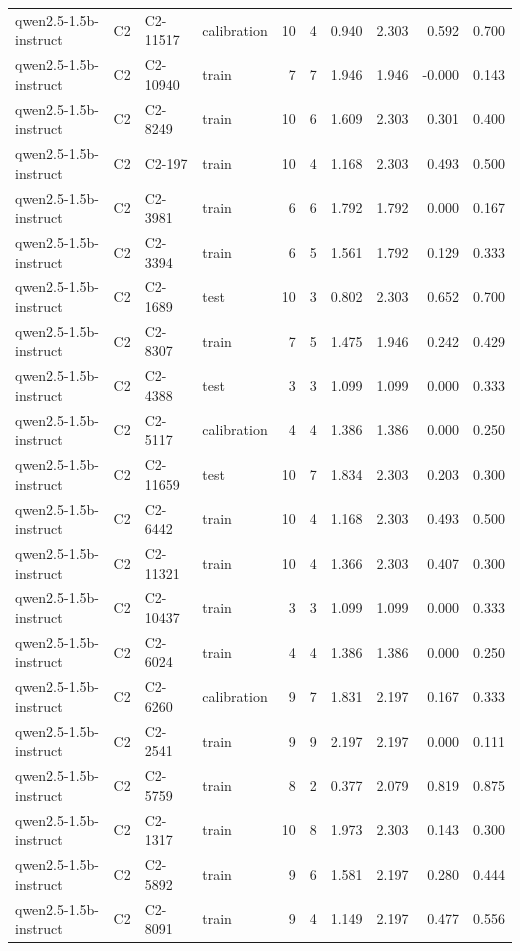 \begin{table}
\begin{tabular}{llllrrrrrr}
qwen2.5-1.5b-instruct & C2 & C2-11517 & calibration & 10 & 4 & 0.940 & 2.303 & 0.592 & 0.700 \\
qwen2.5-1.5b-instruct & C2 & C2-10940 & train & 7 & 7 & 1.946 & 1.946 & -0.000 & 0.143 \\
qwen2.5-1.5b-instruct & C2 & C2-8249 & train & 10 & 6 & 1.609 & 2.303 & 0.301 & 0.400 \\
qwen2.5-1.5b-instruct & C2 & C2-197 & train & 10 & 4 & 1.168 & 2.303 & 0.493 & 0.500 \\
qwen2.5-1.5b-instruct & C2 & C2-3981 & train & 6 & 6 & 1.792 & 1.792 & 0.000 & 0.167 \\
qwen2.5-1.5b-instruct & C2 & C2-3394 & train & 6 & 5 & 1.561 & 1.792 & 0.129 & 0.333 \\
qwen2.5-1.5b-instruct & C2 & C2-1689 & test & 10 & 3 & 0.802 & 2.303 & 0.652 & 0.700 \\
qwen2.5-1.5b-instruct & C2 & C2-8307 & train & 7 & 5 & 1.475 & 1.946 & 0.242 & 0.429 \\
qwen2.5-1.5b-instruct & C2 & C2-4388 & test & 3 & 3 & 1.099 & 1.099 & 0.000 & 0.333 \\
qwen2.5-1.5b-instruct & C2 & C2-5117 & calibration & 4 & 4 & 1.386 & 1.386 & 0.000 & 0.250 \\
qwen2.5-1.5b-instruct & C2 & C2-11659 & test & 10 & 7 & 1.834 & 2.303 & 0.203 & 0.300 \\
qwen2.5-1.5b-instruct & C2 & C2-6442 & train & 10 & 4 & 1.168 & 2.303 & 0.493 & 0.500 \\
qwen2.5-1.5b-instruct & C2 & C2-11321 & train & 10 & 4 & 1.366 & 2.303 & 0.407 & 0.300 \\
qwen2.5-1.5b-instruct & C2 & C2-10437 & train & 3 & 3 & 1.099 & 1.099 & 0.000 & 0.333 \\
qwen2.5-1.5b-instruct & C2 & C2-6024 & train & 4 & 4 & 1.386 & 1.386 & 0.000 & 0.250 \\
qwen2.5-1.5b-instruct & C2 & C2-6260 & calibration & 9 & 7 & 1.831 & 2.197 & 0.167 & 0.333 \\
qwen2.5-1.5b-instruct & C2 & C2-2541 & train & 9 & 9 & 2.197 & 2.197 & 0.000 & 0.111 \\
qwen2.5-1.5b-instruct & C2 & C2-5759 & train & 8 & 2 & 0.377 & 2.079 & 0.819 & 0.875 \\
qwen2.5-1.5b-instruct & C2 & C2-1317 & train & 10 & 8 & 1.973 & 2.303 & 0.143 & 0.300 \\
qwen2.5-1.5b-instruct & C2 & C2-5892 & train & 9 & 6 & 1.581 & 2.197 & 0.280 & 0.444 \\
qwen2.5-1.5b-instruct & C2 & C2-8091 & train & 9 & 4 & 1.149 & 2.197 & 0.477 & 0.556 \\

\end{tabular}
\end{table}
